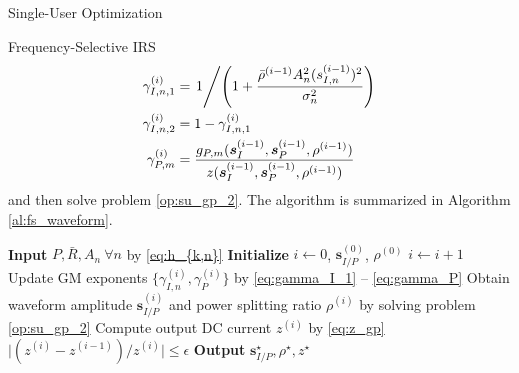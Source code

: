 \documentclass{IEEEtran}
\begin{document}
\begin{section}{Single-User Optimization}
\begin{subsection}{Frequency-Selective IRS}
		\begin{align}
			\gamma_{I,n,1}^{(i)} & = \left. 1 \middle/ \left(1+\frac{\bar{\rho}^{(i-1)}{A_n^2}(s_{I,n}^{(i-1)})^2}{\sigma_n^2}\right) \right.\label{eq:gamma_I_1}\\
			\gamma_{I,n,2}^{(i)} & = 1 - \gamma_{I,n,1}^{(i)}\label{eq:gamma_I_2}\\
			\gamma_{P,m}^{(i)} & =\frac{g_{P,m}(\boldsymbol{s}_I^{(i-1)},\boldsymbol{s}_P^{(i-1)},\rho^{(i-1)})}{z(\boldsymbol{s}_I^{(i-1)},\boldsymbol{s}_P^{(i-1)},\rho^{(i-1)})}\label{eq:gamma_P}
		\end{align}
		and then solve problem \ref{op:su_gp_2}. The algorithm is summarized in Algorithm \ref{al:fs_waveform}.
		\begin{algorithm}
			\caption{FS-IRS: Waveform and Splitting Ratio}
			\label{al:fs_waveform}
			\begin{algorithmic}[1]
				\State \textbf{Input} $P, \bar{R}, A_n \ \forall n$ by \ref{eq:h_{k,n}}
				\State \textbf{Initialize} $i \leftarrow 0$, $\boldsymbol{s}_{I/P}^{(0)}$, $\rho^{(0)}$
				\Repeat
				\State $i \leftarrow i + 1$
				\State Update GM exponents $\{\gamma_{I,n}^{(i)},\gamma_{P}^{(i)}\}$ by \ref{eq:gamma_I_1} -- \ref{eq:gamma_P}
				\State Obtain waveform amplitude $\boldsymbol{s}_{I/P}^{(i)}$ and power splitting ratio $\rho^{(i)}$ by solving problem \ref{op:su_gp_2}
				\State Compute output DC current $z^{(i)}$ by \ref{eq:z_gp}
				\Until $\lvert (z^{(i)} - z^{(i-1)}) / z^{(i)} \rvert \le \epsilon$
				\State \textbf{Output} $\boldsymbol{s}_{I/P}^{\star}, \rho^{\star}, z^{\star}$
			\end{algorithmic}
		\end{algorithm}
	\end{subsection}


\end{section}
\end{document}

